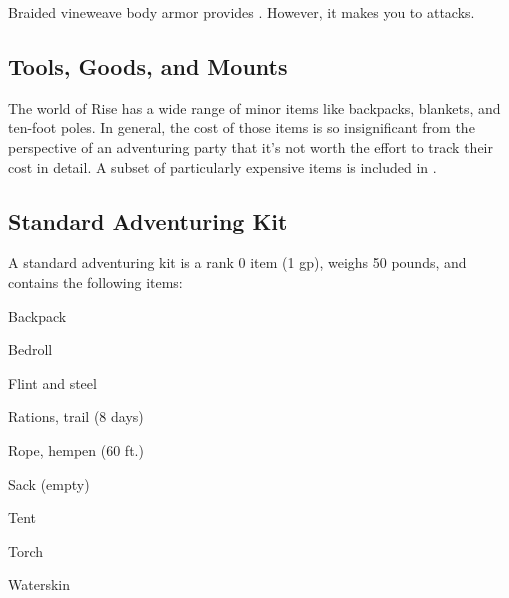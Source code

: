        Braided vineweave body armor provides  .
      However, it makes you \vulnerable to \atFire attacks.


  \begin{longcolumn}
    \section{Tools, Goods, and Mounts}
      \begin{longtablepreface}

        The world of Rise has a wide range of minor items like backpacks, blankets, and ten-foot poles.
        In general, the cost of those items is so insignificant from the perspective of an adventuring party that it's not worth the effort to track their cost in detail.
        A subset of particularly expensive items is included in .

        \subsection{Standard Adventuring Kit}\label{Standard Adventuring Kit}
          A standard adventuring kit is a rank 0 item (1 gp), weighs 50 pounds, and contains the following items:
          \begin{raggeditemize}
            \item Backpack
            \item Bedroll
            \item Flint and steel
            \item Rations, trail (8 days)
            \item Rope, hempen (60 ft.)
            \item Sack (empty)
            \item Tent
            \item Torch
            \item Waterskin
          \end{raggeditemize}
      \end{longtablepreface}

      
  \end{longcolumn}


